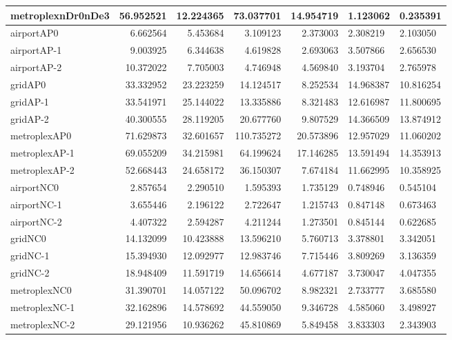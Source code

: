 \begin{longtable}{|l|r|r|r|r|}
metroplexnDr0nDe3 & 56.952521 & 12.224365 & 73.037701 & 14.954719 & 1.123062 & 0.235391 \\ \hline
airportAP0 & 6.662564 & 5.453684 & 3.109123 & 2.373003 & 2.308219 & 2.103050 \\ \hline
airportAP-1 & 9.003925 & 6.344638 & 4.619828 & 2.693063 & 3.507866 & 2.656530 \\ \hline
airportAP-2 & 10.372022 & 7.705003 & 4.746948 & 4.569840 & 3.193704 & 2.765978 \\ \hline
gridAP0 & 33.332952 & 23.223259 & 14.124517 & 8.252534 & 14.968387 & 10.816254 \\ \hline
gridAP-1 & 33.541971 & 25.144022 & 13.335886 & 8.321483 & 12.616987 & 11.800695 \\ \hline
gridAP-2 & 40.300555 & 28.119205 & 20.677760 & 9.807529 & 14.366509 & 13.874912 \\ \hline
metroplexAP0 & 71.629873 & 32.601657 & 110.735272 & 20.573896 & 12.957029 & 11.060202 \\ \hline
metroplexAP-1 & 69.055209 & 34.215981 & 64.199624 & 17.146285 & 13.591494 & 14.353913 \\ \hline
metroplexAP-2 & 52.668443 & 24.658172 & 36.150307 & 7.674184 & 11.662995 & 10.358925 \\ \hline
airportNC0 & 2.857654 & 2.290510 & 1.595393 & 1.735129 & 0.748946 & 0.545104 \\ \hline
airportNC-1 & 3.655446 & 2.196122 & 2.722647 & 1.215743 & 0.847148 & 0.673463 \\ \hline
airportNC-2 & 4.407322 & 2.594287 & 4.211244 & 1.273501 & 0.845144 & 0.622685 \\ \hline
gridNC0 & 14.132099 & 10.423888 & 13.596210 & 5.760713 & 3.378801 & 3.342051 \\ \hline
gridNC-1 & 15.394930 & 12.092977 & 12.983746 & 7.715446 & 3.809269 & 3.136359 \\ \hline
gridNC-2 & 18.948409 & 11.591719 & 14.656614 & 4.677187 & 3.730047 & 4.047355 \\ \hline
metroplexNC0 & 31.390701 & 14.057122 & 50.096702 & 8.982321 & 2.733777 & 3.685580 \\ \hline
metroplexNC-1 & 32.162896 & 14.578692 & 44.559050 & 9.346728 & 4.585060 & 3.498927 \\ \hline
metroplexNC-2 & 29.121956 & 10.936262 & 45.810869 & 5.849458 & 3.833303 & 2.343903 \\ \hline
\end{longtable}
